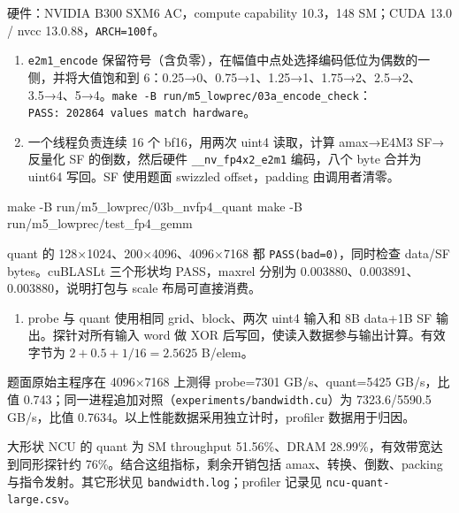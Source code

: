 \documentclass[11pt,a4paper,fontset=fandol]{ctexart}
\providecommand{\tightlist}{\setlength{\itemsep}{0pt}\setlength{\parskip}{0pt}}
\newenvironment{Shaded}{}{}
\newcommand{\AttributeTok}[1]{\textcolor[rgb]{0.49,0.56,0.16}{#1}}
\newcommand{\FunctionTok}[1]{\textcolor[rgb]{0.02,0.16,0.49}{#1}}
\newcommand{\NormalTok}[1]{#1}
\begin{document}
\begin{answer}

硬件：NVIDIA B300 SXM6 AC，compute capability 10.3，148 SM；CUDA 13.0 /
nvcc 13.0.88，\texttt{ARCH=\allowbreak{}100f}。

\begin{enumerate}
\def\labelenumi{(\alph{enumi})}
\item
  \texttt{e2m1\_\allowbreak{}encode}
  保留符号（含负零），在幅值中点处选择编码低位为偶数的一侧，并将大值饱和到
  6：0.25→0、0.75→1、1.25→1、1.75→2、2.5→2、3.5→4、5→4。\texttt{make\ -\allowbreak{}B\ run/\allowbreak{}m5\_\allowbreak{}lowprec/\allowbreak{}03a\_\allowbreak{}encode\_\allowbreak{}check}：\texttt{PASS:\allowbreak{}\ 202864\ values\ match\ hardware}。
\item
  一个线程负责连续 16 个 bf16，用两次 uint4 读取，计算 amax→E4M3
  SF→反量化 SF 的倒数，然后硬件
  \texttt{\_\allowbreak{}\_\allowbreak{}nv\_\allowbreak{}fp4x2\_\allowbreak{}e2m1}
  编码，八个 byte 合并为 uint64 写回。SF 使用题面 swizzled
  offset，padding 由调用者清零。
\end{enumerate}

\begin{Shaded}
\begin{Highlighting}[]
\FunctionTok{make} \AttributeTok{{-}B}\NormalTok{ run/m5\_lowprec/03b\_nvfp4\_quant}
\FunctionTok{make} \AttributeTok{{-}B}\NormalTok{ run/m5\_lowprec/test\_fp4\_gemm}
\end{Highlighting}
\end{Shaded}

quant 的 128×1024、200×4096、4096×7168 都
\texttt{PASS(bad=\allowbreak{}0)}，同时检查 data/SF bytes。cuBLASLt
三个形状均 PASS，maxrel 分别为 0.003880、0.003891、0.003880，说明打包与
scale 布局可直接消费。

\begin{enumerate}
\def\labelenumi{(\alph{enumi})}
\setcounter{enumi}{2}
\tightlist
\item
  probe 与 quant 使用相同 grid、block、两次 uint4 输入和 8B data+1B SF
  输出。探针对所有输入 word 做 XOR
  后写回，使读入数据参与输出计算。有效字节为 \(2+0.5+1/16=2.5625\)
  B/elem。
\end{enumerate}

题面原始主程序在 4096×7168 上测得 probe=7301 GB/s、quant=5425 GB/s，比值
0.743；同一进程追加对照（\texttt{experiments/\allowbreak{}bandwidth.\allowbreak{}cu}）为
7323.6/5590.5 GB/s，比值 0.7634。以上性能数据采用独立计时，profiler
数据用于归因。

大形状 NCU 的 quant 为 SM throughput 51.56\%、DRAM
28.99\%，有效带宽达到同形探针约 76\%。结合这组指标，剩余开销包括
amax、转换、倒数、packing 与指令发射。其它形状见
\texttt{bandwidth.\allowbreak{}log}；profiler 记录见
\texttt{ncu-\allowbreak{}quant-\allowbreak{}large.\allowbreak{}csv}。


\end{answer}
\end{document}
